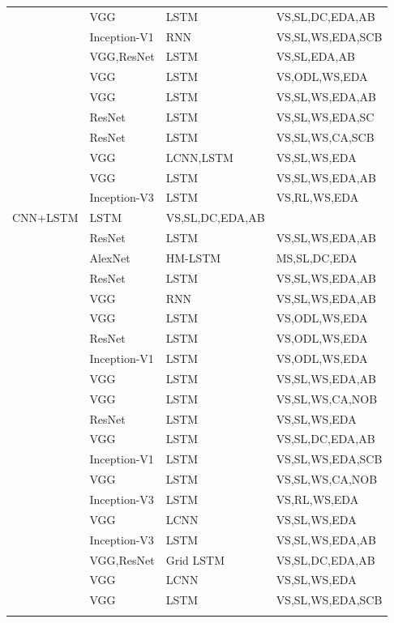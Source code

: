 \begin{longtable}{ p{} p{} p{} p{}}
    \citet{Yang2016_RevNet} & VGG & LSTM & VS,SL,DC,EDA,AB\\
    \citet{You2016} & Inception-V1 & RNN & VS,SL,WS,EDA,SCB\\
    \citet{Chen2017} & VGG,ResNet & LSTM & VS,SL,EDA,AB\\
    \citet{Dai2017} & VGG & LSTM & VS,ODL,WS,EDA\\
    \citet{Fu2017} & VGG & LSTM & VS,SL,WS,EDA,AB\\
    \citet{Gan2017a} & ResNet & LSTM & VS,SL,WS,EDA,SC\\
    \citet{Gan2017b} & ResNet & LSTM & VS,SL,WS,CA,SCB\\
    \citet{Gu2017} & VGG & LCNN,LSTM & VS,SL,WS,EDA\\
    \citet{Liu2017_SAM} & VGG & LSTM & VS,SL,WS,EDA,AB\\
    \citet{Liu2017_PG} & Inception-V3 & LSTM & VS,RL,WS,EDA\\
    \citet{Liu2017_MAT} CNN+LSTM & LSTM & VS,SL,DC,EDA,AB\\
    \citet{Lu2017} & ResNet & LSTM & VS,SL,WS,EDA,AB\\
    \citet{Niu2017} & AlexNet & HM-LSTM & MS,SL,DC,EDA\\
    \citet{Park2017} & ResNet & LSTM & VS,SL,WS,EDA,AB\\
    \citet{Pedersoli2017} & VGG & RNN & VS,SL,WS,EDA,AB\\
    \citet{Ren2017} & VGG & LSTM & VS,ODL,WS,EDA\\
    \citet{Rennie2017} & ResNet & LSTM & VS,ODL,WS,EDA\\
    \citet{Shetty2017} & Inception-V1 & LSTM & VS,ODL,WS,EDA\\
    \citet{Tavakoliy2017} & VGG & LSTM & VS,SL,WS,EDA,AB\\
    \citet{Venugopalan2017} & VGG & LSTM & VS,SL,WS,CA,NOB\\
    \citet{Wang2017} & ResNet & LSTM & VS,SL,WS,EDA\\
    \citet{Yang2017} & VGG & LSTM & VS,SL,DC,EDA,AB\\
    \citet{Yao2017_ATT} & Inception-V1 & LSTM & VS,SL,WS,EDA,SCB\\
    \citet{Yao2017_NOB} & VGG & LSTM & VS,SL,WS,CA,NOB\\
    \citet{Zhang2017} & Inception-V3 & LSTM & VS,RL,WS,EDA\\
    \citet{Aneja2018} & VGG & LCNN & VS,SL,WS,EDA\\
    \citet{Jiang2018} & Inception-V3 & LSTM & VS,SL,WS,EDA,AB\\
    \citet{Khademi2018} & VGG,ResNet & Grid LSTM & VS,SL,DC,EDA,AB\\
    \citet{Wang2018} & VGG & LCNN & VS,SL,WS,EDA\\
    \citet{Wu2018} & VGG & LSTM & VS,SL,WS,EDA,SCB\\
    \bottomrule
\label{tab:classification}
\end{longtable}
\endgroup

